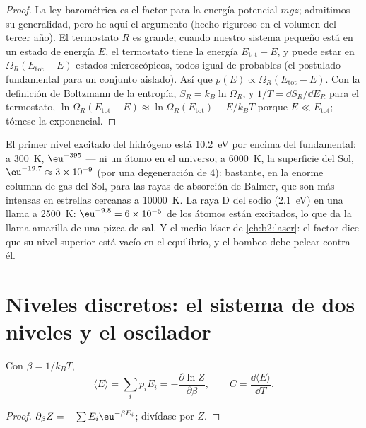 \begin{proof}
La ley barométrica es el factor para la energía potencial $mgz$;
admitimos su generalidad, pero he aquí el argumento (hecho riguroso en el
volumen del tercer año). El termostato $R$ es grande; cuando nuestro sistema pequeño está en
un estado de energía $E$, el termostato tiene la energía $E_{\text{tot}} -
E$, y puede estar en $\Omega_R(E_{\text{tot}} - E)$ estados microscópicos, todos
igual de probables (el postulado fundamental para un conjunto aislado). Así que
$p(E) \propto \Omega_R(E_{\text{tot}} - E)$. Con la definición de Boltzmann
de la entropía, $S_R = k_B\ln\Omega_R$, y $1/T = \dd S_R/\dd E_R$ para el
termostato, $\ln\Omega_R(E_{\text{tot}} - E) \approx \ln\Omega_R(E_{\text{tot}})
- E/k_BT$ porque $E \ll E_{\text{tot}}$; tómese la exponencial.
\end{proof}

\begin{example}\label{ex:b2:boltzmann-factor:levels}
El primer nivel excitado del hidrógeno está \qty{10.2}{eV} por encima del
fundamental: a \qty{300}{K}, $\eu^{-395}$ --- ni un átomo en el universo; a
\qty{6000}{K}, la superficie del Sol, $\eu^{-19.7} \approx 3 \times 10^{-9}$ (por
una degeneración de $4$): bastante, en la enorme columna de gas del Sol, para
las rayas de absorción de Balmer, que son más intensas en estrellas cercanas a \qty{10000}{K}.
La raya D del sodio (\qty{2.1}{eV}) en una llama a \qty{2500}{K}: $\eu^{-9.8} = 6
\times 10^{-5}$ de los átomos están excitados, lo que da la llama amarilla de una
pizca de sal. Y el medio láser de \cref{ch:b2:laser}: el factor
dice que su nivel superior está vacío en el equilibrio, y el bombeo debe pelear
contra él.
\end{example}

\section{Niveles discretos: el sistema de dos niveles y el oscilador}

\begin{proposition}\label{prop:b2:boltzmann-factor:meanE}
Con $\beta = 1/k_BT$,
\[
\langle E\rangle = \sum_ip_iE_i = -\frac{\partial\ln Z}{\partial\beta}, \qquad
C = \frac{\dd\langle E\rangle}{\dd T} .
\]
\end{proposition}

\begin{proof}
$\partial_\beta Z = -\sum E_i\eu^{-\beta E_i}$; divídase por $Z$.
\end{proof}

